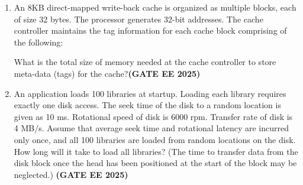 \documentclass[journal,12pt,onecolumn]{IEEEtran}
\theoremstyle{remark}
\begin{document}
\begin{enumerate}
\begin{enumerate}
\end{enumerate}

\item  An 8KB direct-mapped write-back cache is organized as multiple blocks, each of size 32 bytes. The processor generates 32-bit addresses. The cache controller maintains the tag information for each cache block comprising of the following:



What is the total size of memory needed at the cache controller to store meta-data (tags) for the cache?\hfill \textbf{(GATE EE 2025)} 

\begin{enumerate}
\end{enumerate}


\item  An application loads 100 libraries at startup. Loading each library requires exactly one disk access. The seek time of the disk to a random location is given as 10 ms. Rotational speed of disk is 6000 rpm. Transfer rate of disk is 4 MB/s. Assume that average seek time and rotational latency are incurred only once, and all 100 libraries are loaded from random locations on the disk. How long will it take to load all libraries? (The time to transfer data from the disk block once the head has been positioned at the start of the block may be neglected.) \hfill \textbf{(GATE EE 2025)}

\begin{enumerate}
\end{enumerate}



\end{enumerate}
\end{document}
